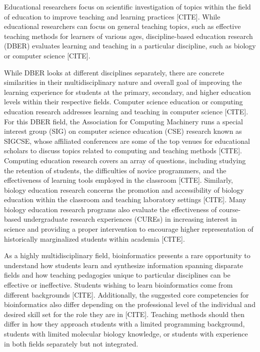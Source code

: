 Educational researchers focus on scientific investigation of topics within the field of education to improve teaching and learning practices [CITE]. While educational researchers can focus on general teaching topics, such as effective teaching methods for learners of various ages, discipline-based education research (DBER) evaluates learning and teaching in a particular discipline, such as biology or computer science [CITE]. 

While DBER looks at different disciplines separately, there are concrete similarities in their multidisciplinary nature and overall goal of improving the learning experience for students at the primary, secondary, and higher education levels within their respective fields. Computer science education or computing education research addresses learning and teaching in computer science [CITE]. For this DBER field, the Association for Computing Machinery runs a special interest group (SIG) on computer science education (CSE) research known as SIGCSE, whose affiliated conferences are some of the top venues for educational scholars to discuss topics related to computing and teaching methods [CITE]. Computing education research covers an array of questions, including studying the retention of students, the difficulties of novice programmers, and the effectiveness of learning tools employed in the classroom [CITE]. Similarly, biology education research concerns the promotion and accessibility of biology education within the classroom and teaching laboratory settings [CITE]. Many biology education research programs also evaluate the effectiveness of course-based undergraduate research experiences (CUREs) in increasing interest in science and providing a proper intervention to encourage higher representation of historically marginalized students within academia [CITE]. 

As a highly multidisciplinary field, bioinformatics presents a rare opportunity to understand how students learn and synthesize information spanning disparate fields and how teaching pedagogies unique to particular disciplines can be effective or ineffective. Students wishing to learn bioinformatics come from different backgrounds [CITE]. Additionally, the suggested core competencies for bioinformatics also differ depending on the professional level of the individual and desired skill set for the role they are in [CITE]. Teaching methods should then differ in how they approach students with a limited programming background, students with limited molecular biology knowledge, or students with experience in both fields separately but not integrated.  


